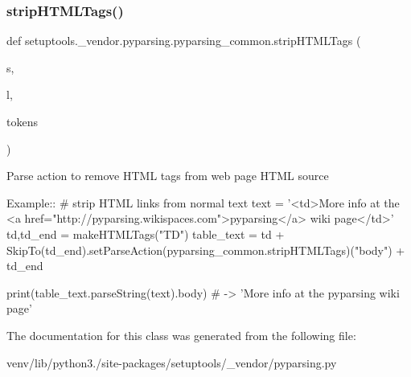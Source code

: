 \subsubsection{\texorpdfstring{strip\+H\+T\+M\+L\+Tags()}{stripHTMLTags()}}
{\footnotesize\ttfamily def setuptools.\+\_\+vendor.\+pyparsing.\+pyparsing\+\_\+common.\+strip\+H\+T\+M\+L\+Tags (\begin{DoxyParamCaption}\item[{}]{s,  }\item[{}]{l,  }\item[{}]{tokens }\end{DoxyParamCaption})\hspace{0.3cm}{\ttfamily [static]}}

\begin{DoxyVerb}Parse action to remove HTML tags from web page HTML source

Example::
    # strip HTML links from normal text 
    text = '<td>More info at the <a href="http://pyparsing.wikispaces.com">pyparsing</a> wiki page</td>'
    td,td_end = makeHTMLTags("TD")
    table_text = td + SkipTo(td_end).setParseAction(pyparsing_common.stripHTMLTags)("body") + td_end
    
    print(table_text.parseString(text).body) # -> 'More info at the pyparsing wiki page'
\end{DoxyVerb}
 

The documentation for this class was generated from the following file\+:\begin{DoxyCompactItemize}
\item 
venv/lib/python3./site-\/packages/setuptools/\+\_\+vendor/pyparsing.\+py\end{DoxyCompactItemize}
